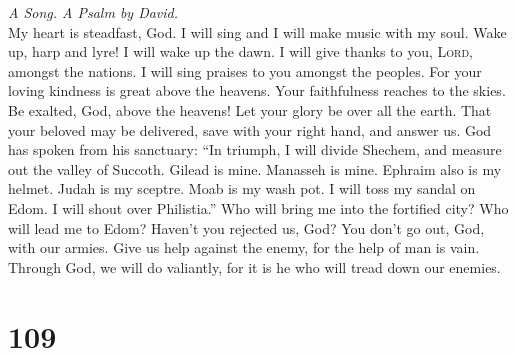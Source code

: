 \emph{A Song. A Psalm by David.}\\
 My heart is steadfast, God. I will sing and I will make
music with my soul.  Wake up, harp and lyre! I will wake
up the dawn.  I will give thanks to you, \textsc{Lord},
amongst the nations. I will sing praises to you amongst the peoples.
 For your loving kindness is great above the heavens. Your
faithfulness reaches to the skies.  Be exalted, God, above
the heavens! Let your glory be over all the earth.  That
your beloved may be delivered, save with your right hand, and answer us.
 God has spoken from his sanctuary: ``In triumph, I will
divide Shechem, and measure out the valley of Succoth. 
Gilead is mine. Manasseh is mine. Ephraim also is my helmet. Judah is my
sceptre.  Moab is my wash pot. I will toss my sandal on
Edom. I will shout over Philistia.''  Who will bring me
into the fortified city? Who will lead me to Edom? 
Haven't you rejected us, God? You don't go out, God, with our armies.
 Give us help against the enemy, for the help of man is
vain.  Through God, we will do valiantly, for it is he
who will tread down our enemies.

\hypertarget{section-108}{%
\section{109}\label{section-108}}

